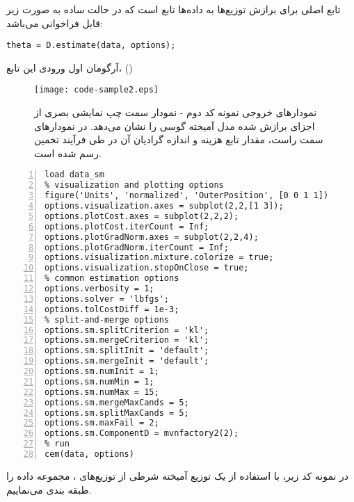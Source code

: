 تابع اصلی برای برازش توزیع‌ها به داده‌ها تابع
است که در حالت ساده به صورت زیر قابل فراخوانی می‌باشد:
\begin{latin}
	\begin{lstlisting}
theta = D.estimate(data, options);
	\end{lstlisting}
\end{latin}
آرگومان اول ورودی این تابع،
()\begin{figure}[b!]
	\begin{center}
		\texttt{[image: code-sample2.eps]}
	\end{center}
	\caption[نمودارهای خروجی نمونه کد دوم]
	{
نمودارهای خروجی نمونه کد دوم -
نمودار سمت چپ نمایشی بصری از اجزای برازش شده مدل آمیخته گوسی را نشان می‌دهد.
در نمودارهای سمت راست، مقدار تابع هزینه و اندازه گرادیان آن در طی فرآیند تخمین رسم شده است.
		\label{fig.code-sample2}
	}
\end{figure}


\begin{latin}
\begin{lstlisting}[frame=single,numbers=left,aboveskip={\baselineskip},belowskip={1.5\baselineskip}]
load data_sm
% visualization and plotting options
figure('Units', 'normalized', 'OuterPosition', [0 0 1 1])
options.visualization.axes = subplot(2,2,[1 3]);
options.plotCost.axes = subplot(2,2,2);
options.plotCost.iterCount = Inf;
options.plotGradNorm.axes = subplot(2,2,4);
options.plotGradNorm.iterCount = Inf;
options.visualization.mixture.colorize = true;
options.visualization.stopOnClose = true;
% common estimation options
options.verbosity = 1;
options.solver = 'lbfgs';
options.tolCostDiff = 1e-3;
% split-and-merge options
options.sm.splitCriterion = 'kl';
options.sm.mergeCriterion = 'kl';
options.sm.splitInit = 'default';
options.sm.mergeInit = 'default';
options.sm.numInit = 1;
options.sm.numMin = 1;
options.sm.numMax = 15;
options.sm.mergeMaxCands = 5;
options.sm.splitMaxCands = 5;
options.sm.maxFail = 2;
options.sm.ComponentD = mvnfactory2(2);
% run
cem(data, options)
\end{lstlisting}
\end{latin}

\pagebreak %
در نمونه کد زیر، با استفاده از یک توزیع آمیخته شرطی از توزیع‌های ، مجموعه داده  را طبقه بندی می‌نماییم.

